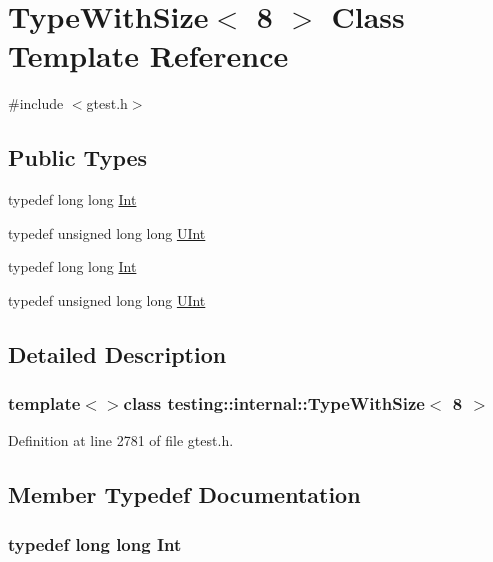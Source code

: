 \hypertarget{classtesting_1_1internal_1_1TypeWithSize_3_018_01_4}{\section{\-Type\-With\-Size$<$ 8 $>$ \-Class \-Template \-Reference}
\label{d8/da4/classtesting_1_1internal_1_1TypeWithSize_3_018_01_4}
}


{\ttfamily \#include $<$gtest.\-h$>$}

\subsection*{\-Public \-Types}
\begin{DoxyCompactItemize}
\item 
typedef long long \hyperlink{classtesting_1_1internal_1_1TypeWithSize_3_018_01_4_a1117baba620e5dd9dc3293724e10a15f}{\-Int}
\item 
typedef unsigned long long \hyperlink{classtesting_1_1internal_1_1TypeWithSize_3_018_01_4_a09f1489f5176f7ccd5484718e1449838}{\-U\-Int}
\item 
typedef long long \hyperlink{classtesting_1_1internal_1_1TypeWithSize_3_018_01_4_a1117baba620e5dd9dc3293724e10a15f}{\-Int}
\item 
typedef unsigned long long \hyperlink{classtesting_1_1internal_1_1TypeWithSize_3_018_01_4_a09f1489f5176f7ccd5484718e1449838}{\-U\-Int}
\end{DoxyCompactItemize}


\subsection{\-Detailed \-Description}
\subsubsection*{template$<$$>$class testing\-::internal\-::\-Type\-With\-Size$<$ 8 $>$}



\-Definition at line 2781 of file gtest.\-h.



\subsection{\-Member \-Typedef \-Documentation}
\hypertarget{classtesting_1_1internal_1_1TypeWithSize_3_018_01_4_a1117baba620e5dd9dc3293724e10a15f}{
\subsubsection[{\-Int}]{\setlength{\rightskip}{0pt plus 5cm}typedef long long {\bf \-Int}}}\label{d8/da4/classtesting_1_1internal_1_1TypeWithSize_3_018_01_4_a1117baba620e5dd9dc3293724e10a15f}


